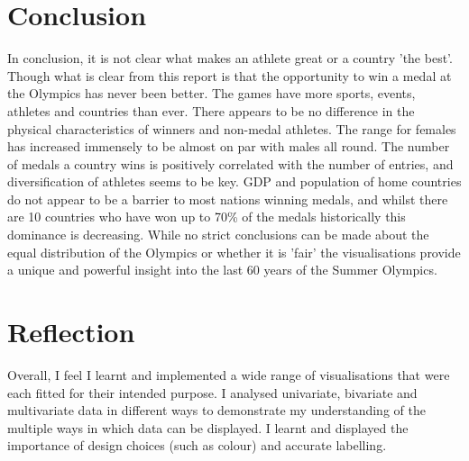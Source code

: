 \documentclass[a4 paper, 12pt]{article}
\begin{document}
    \section{Conclusion}  
    In conclusion, it is not clear what makes an athlete great or a country 'the best'. Though what is clear from this report is that the opportunity to win a medal at the Olympics has never been better. The games have more sports, events, athletes and countries than ever. There appears to be no difference in the physical characteristics of winners and non-medal athletes. The range for females has increased immensely to be almost on par with males all round. The number of medals a country wins is positively correlated with the number of entries, and diversification of athletes seems to be key. GDP and population of home countries do not appear to be a barrier to most nations winning medals, and whilst there are 10 countries who have won up to 70\% of the medals historically this dominance is decreasing. While no strict conclusions can be made about the equal distribution of the Olympics or whether it is 'fair' the visualisations provide a unique and powerful insight into the last 60 years of the Summer Olympics. 

    \pagebreak
    \section{Reflection}
    Overall, I feel I learnt and implemented a wide range of visualisations that were each fitted for their intended purpose. I analysed univariate, bivariate and multivariate data in different ways to demonstrate my understanding of the multiple ways in which data can be displayed. I learnt and displayed the importance of design choices (such as colour) and accurate labelling.
\end{document}
